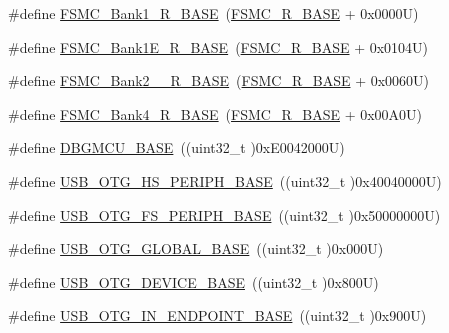 \begin{DoxyCompactItemize}
\item 
\#define \hyperlink{group___peripheral__registers__structures_gad196fe6f5e4041b201d14f43508c06d2}{F\+S\+M\+C\+\_\+\+Bank1\+\_\+\+R\+\_\+\+B\+A\+SE}~(\hyperlink{group___peripheral__registers__structures_gaddf0e199dccba83272b20c9fb4d3aaed}{F\+S\+M\+C\+\_\+\+R\+\_\+\+B\+A\+SE} + 0x0000\+U)
\item 
\#define \hyperlink{group___peripheral__registers__structures_gaea182589c84aee30b7f735474d8774e2}{F\+S\+M\+C\+\_\+\+Bank1\+E\+\_\+\+R\+\_\+\+B\+A\+SE}~(\hyperlink{group___peripheral__registers__structures_gaddf0e199dccba83272b20c9fb4d3aaed}{F\+S\+M\+C\+\_\+\+R\+\_\+\+B\+A\+SE} + 0x0104\+U)
\item 
\#define \hyperlink{group___peripheral__registers__structures_ga851707a200f63e03c336073706fdce1d}{F\+S\+M\+C\+\_\+\+Bank2\+\_\+\_\+\+R\+\_\+\+B\+A\+SE}~(\hyperlink{group___peripheral__registers__structures_gaddf0e199dccba83272b20c9fb4d3aaed}{F\+S\+M\+C\+\_\+\+R\+\_\+\+B\+A\+SE} + 0x0060\+U)
\item 
\#define \hyperlink{group___peripheral__registers__structures_gaf9e5417133160b0bdd0498d982acec19}{F\+S\+M\+C\+\_\+\+Bank4\+\_\+\+R\+\_\+\+B\+A\+SE}~(\hyperlink{group___peripheral__registers__structures_gaddf0e199dccba83272b20c9fb4d3aaed}{F\+S\+M\+C\+\_\+\+R\+\_\+\+B\+A\+SE} + 0x00\+A0\+U)
\item 
\#define \hyperlink{group___peripheral__registers__structures_ga4adaf4fd82ccc3a538f1f27a70cdbbef}{D\+B\+G\+M\+C\+U\+\_\+\+B\+A\+SE}~((uint32\+\_\+t )0x\+E0042000\+U)
\item 
\#define \hyperlink{group___peripheral__registers__structures_gaa405d2ebfd7e9394237b6639f16a5409}{U\+S\+B\+\_\+\+O\+T\+G\+\_\+\+H\+S\+\_\+\+P\+E\+R\+I\+P\+H\+\_\+\+B\+A\+SE}~((uint32\+\_\+t )0x40040000\+U)
\item 
\#define \hyperlink{group___peripheral__registers__structures_gaa86d4c80849a74938924e73937b904e7}{U\+S\+B\+\_\+\+O\+T\+G\+\_\+\+F\+S\+\_\+\+P\+E\+R\+I\+P\+H\+\_\+\+B\+A\+SE}~((uint32\+\_\+t )0x50000000\+U)
\item 
\#define \hyperlink{group___peripheral__registers__structures_ga044aa4388e72d9d47a03f387fb8926fb}{U\+S\+B\+\_\+\+O\+T\+G\+\_\+\+G\+L\+O\+B\+A\+L\+\_\+\+B\+A\+SE}~((uint32\+\_\+t )0x000\+U)
\item 
\#define \hyperlink{group___peripheral__registers__structures_ga4d74a337597a77b1fca978202b519a18}{U\+S\+B\+\_\+\+O\+T\+G\+\_\+\+D\+E\+V\+I\+C\+E\+\_\+\+B\+A\+SE}~((uint32\+\_\+t )0x800\+U)
\item 
\#define \hyperlink{group___peripheral__registers__structures_gad8f69041452615aeb3948600e3882246}{U\+S\+B\+\_\+\+O\+T\+G\+\_\+\+I\+N\+\_\+\+E\+N\+D\+P\+O\+I\+N\+T\+\_\+\+B\+A\+SE}~((uint32\+\_\+t )0x900\+U)

\end{DoxyCompactItemize}
